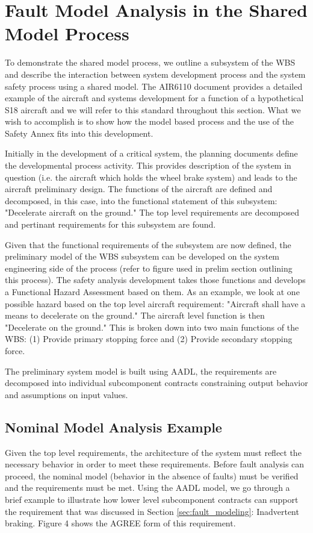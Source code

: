 \section{Fault Model Analysis in the Shared Model Process}
\label{sec:fault_analysis_2}

To demonstrate the shared model process, we outline a subsystem of the WBS and describe the interaction between system development process and the system safety process using a shared model. The AIR6110 document provides a detailed example of the aircraft and systems development for a function of a hypothetical S18 aircraft and we will refer to this standard throughout this section. What we wish to accomplish is to show how the model based process and the use of the Safety Annex fits into this development. 

Initially in the development of a critical system, the planning documents define the developmental process activity. This provides description of the system in question (i.e. the aircraft which holds the wheel brake system) and leads to the aircraft preliminary design. The functions of the aircraft are defined and decomposed, in this case, into the functional statement of this subsystem: "Decelerate aircraft on the ground." The top level requirements are decomposed and pertinant requirements for this subsystem are found. 

Given that the functional requirements of the subsystem are now defined, the preliminary model of the WBS subsystem can be developed on the system engineering side of the process (refer to figure used in prelim section outlining this process). The safety analysis development takes those functions and develops a Functional Hazard Assessment based on them. As an example, we look at one possible hazard based on the top level aircraft requirement: "Aircraft shall have a means to decelerate on the ground." The aircraft level function is then "Decelerate on the ground." This is broken down into two main functions of the WBS: (1) Provide primary stopping force and (2) Provide secondary stopping force. 

The preliminary system model is built using AADL, the requirements are decomposed into individual subcomponent contracts constraining output behavior and assumptions on input values.  

\subsection{Nominal Model Analysis Example}
Given the top level requirements, the architecture of the system must reflect the necessary behavior in order to meet these requirements. Before fault analysis can proceed, the nominal model (behavior in the absence of faults) must be verified and the requirements must be met. Using the AADL model, we go through a brief example to illustrate how lower level subcomponent contracts can support the requirement that was discussed in Section \ref{sec:fault_modeling}: Inadvertent braking. Figure 4 shows the AGREE form of this requirement. 

